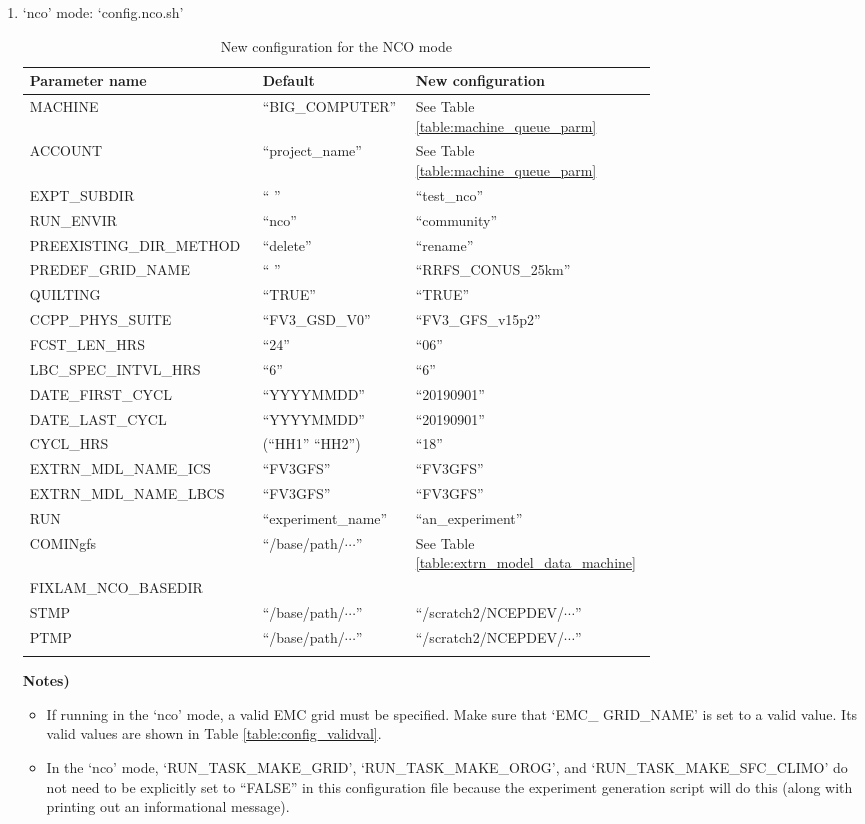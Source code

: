 \documentclass[11pt,fleqn]{report}              %
\begin{document}
\begin{enumerate}
\item `nco' mode: `config.nco.sh'
{
\fontsize{9}{11}\selectfont
\begin{longtable}{p{0.3\linewidth} | p{0.2\linewidth} | p{0.25\linewidth} }
\hline
\hline
Parameter name & Default  & New configuration \\
\hline
 MACHINE & ``BIG\_COMPUTER'' & See Table \ref{table:machine_queue_parm} \\
 ACCOUNT & ``project\_name'' & See Table \ref{table:machine_queue_parm} \\
 EXPT\_SUBDIR & `` '' & ``test\_nco'' \\
 RUN\_ENVIR & ``nco'' & ``community''  \\
 PREEXISTING\_DIR\_METHOD & ``delete''  & ``rename'' \\
 PREDEF\_GRID\_NAME & `` '' & ``RRFS\_CONUS\_25km'' \\
 QUILTING & ``TRUE'' & ``TRUE'' \\
 CCPP\_PHYS\_SUITE & ``FV3\_GSD\_V0'' & ``FV3\_GFS\_v15p2'' \\
 FCST\_LEN\_HRS & ``24'' & ``06'' \\
 LBC\_SPEC\_INTVL\_HRS & ``6'' & ``6'' \\
 DATE\_FIRST\_CYCL & ``YYYYMMDD'' & ``20190901'' \\
 DATE\_LAST\_CYCL & ``YYYYMMDD'' & ``20190901'' \\
 CYCL\_HRS & (``HH1'' ``HH2'') & ``18'' \\
 EXTRN\_MDL\_NAME\_ICS & ``FV3GFS'' & ``FV3GFS'' \\
 EXTRN\_MDL\_NAME\_LBCS & ``FV3GFS'' & ``FV3GFS'' \\
 RUN & ``experiment\_name'' & ``an\_experiment'' \\
 COMINgfs & ``/base/path/$\cdots$'' & See Table \ref{table:extrn_model_data_machine} \\
 FIXLAM\_NCO\_BASEDIR & & \\
 STMP & ``/base/path/$\cdots$'' & ``/scratch2/NCEPDEV/$\cdots$'' \\
 PTMP & ``/base/path/$\cdots$'' & ``/scratch2/NCEPDEV/$\cdots$'' \\
\hline
\caption{New configuration for the NCO mode}
\label{table:config_new_nco}
\end{longtable}
}
{\bf Notes)} 
\begin{itemize}
\item If running in the `nco' mode, a valid EMC grid must be specified. Make sure that `EMC\_ GRID\_NAME' is set to a valid value. Its valid values are shown in Table \ref{table:config_validval}.

\item In the `nco' mode, `RUN\_TASK\_MAKE\_GRID', `RUN\_TASK\_MAKE\_OROG', and `RUN\_TASK\_MAKE\_SFC\_CLIMO' do not need to be explicitly set to ``FALSE'' in this configuration file because the experiment generation script will do this (along with printing out an informational message).

\end{itemize}

\end{enumerate}
\end{document}

